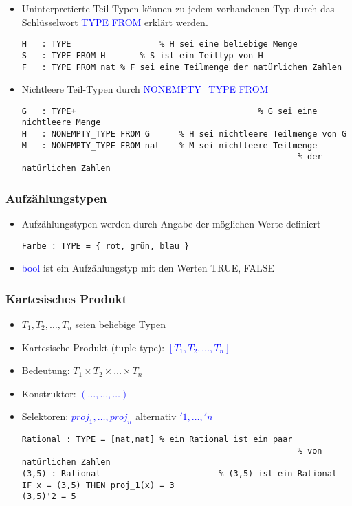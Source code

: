 \documentclass{scrartcl}
\begin{document}
\begin{itemize}
	\item Uninterpretierte Teil-Typen können zu jedem vorhandenen Typ durch das Schlüsselwort \textcolor{blue}{TYPE FROM} erklärt werden.
	\begin{lstlisting}
H	: TYPE					% H sei eine beliebige Menge
S	: TYPE FROM H		% S ist ein Teiltyp von H
F	: TYPE FROM nat	% F sei eine Teilmenge der natürlichen Zahlen
	\end{lstlisting}
	\item Nichtleere Teil-Typen durch \textcolor{blue}{NONEMPTY\_TYPE FROM}
	\begin{lstlisting}
G	: TYPE+										% G sei eine nichtleere Menge
H	: NONEMPTY_TYPE FROM G		% H sei nichtleere Teilmenge von G
M	: NONEMPTY_TYPE FROM nat	% M sei nichtleere Teilmenge
														% der natürlichen Zahlen
	\end{lstlisting}
\end{itemize}

\subsubsection{Aufzählungstypen}

\begin{itemize}
	\item Aufzählungstypen werden durch Angabe der möglichen Werte definiert
	\begin{lstlisting}
Farbe : TYPE = { rot, grün, blau }
	\end{lstlisting}
	\item \textcolor{blue}{bool} ist ein Aufzählungstyp mit den Werten TRUE, FALSE
\end{itemize}

\subsubsection{Kartesisches Produkt}

\begin{itemize}
	\item $ T_1, T_2, \ldots, T_n $ seien beliebige Typen
	\item Kartesische Produkt (tuple type): \textcolor{blue}{$ [T_1,T_2,\ldots,T_n] $}
	\item Bedeutung: $ T_1 \times T_2 \times \ldots \times T_n $
	\item Konstruktor: \textcolor{blue}{$ (\ldots, \ldots, \ldots) $}
	\item Selektoren: \textcolor{blue}{$ proj_1, \ldots, proj_n $} alternativ \textcolor{blue}{$ '1, \ldots, 'n $}
	\begin{lstlisting}
Rational : TYPE = [nat,nat]	% ein Rational ist ein paar
														% von natürlichen Zahlen
(3,5) : Rational						% (3,5) ist ein Rational
IF x = (3,5) THEN proj_1(x) = 3
(3,5)'2 = 5 
	\end{lstlisting}
\end{itemize}
\end{document}
